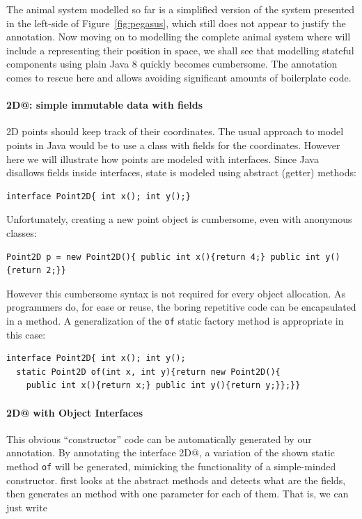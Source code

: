 The animal system modelled so far is a simplified version of the
system presented in the left-side of Figure~\ref{fig:pegasus}, which still does not appear to
justify the \mixinAnn{} annotation.  Now moving on to modelling
the complete animal system where \Q@Animal@s will include a \Q@location@
representing their position in space, we shall
see that modelling stateful components using plain Java 8 quickly becomes
cumbersome. The \mixinAnn{} annotation comes to rescue here and
allows avoiding significant amounts of boilerplate code.

\paragraph{\Q@Point2D@: simple immutable data with fields}
2D points should keep track of their coordinates.  The usual
approach to model points in Java would be to use a class with fields for the
coordinates. However here we will illustrate how points are modeled with
interfaces. Since Java disallows fields inside interfaces, state is modeled
using abstract (getter) methods:

\begin{lstlisting}
interface Point2D{ int x(); int y();}
\end{lstlisting}

\noindent Unfortunately, creating a new point object is cumbersome, even
with anonymous classes:

\begin{lstlisting}
Point2D p = new Point2D(){ public int x(){return 4;} public int y(){return 2;}}
\end{lstlisting}

\noindent However this cumbersome syntax is not required for every
object allocation. As programmers do, for ease or reuse, the boring
repetitive code can be encapsulated in a method. A generalization of the
\texttt{of} static factory method is appropriate in this case:
\begin{lstlisting}
interface Point2D{ int x(); int y();
  static Point2D of(int x, int y){return new Point2D(){
    public int x(){return x;} public int y(){return y;}};}}
\end{lstlisting}

\vspace{-5pt}
\paragraph{\Q@Point2D@ with Object Interfaces}
This obvious ``constructor'' code can be automatically generated by our \mixin
annotation.  By annotating the interface \Q@Point2D@, a variation of the shown
static method \texttt{of} will be generated, mimicking the functionality of a
simple-minded constructor. \mixin first looks at the abstract methods and detects
what are the fields, then generates an \Q@of@ method with one parameter for each
of them. That is, we can just write


